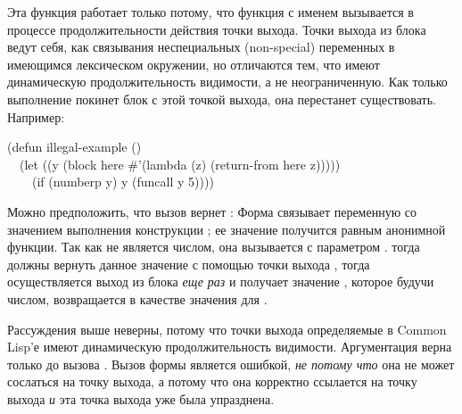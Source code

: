Эта функция  работает только потому, что функция с именем
 вызывается в процессе продолжительности действия точки выхода.
Точки выхода из блока ведут себя, как связывания неспециальных (non-special)
переменных в имеющимся лексическом окружении, но отличаются тем, что имеют
динамическую продолжительность видимости, а не неограниченную. Как только
выполнение покинет блок с этой точкой выхода, она перестанет
существовать. Например: 

\begin{lisp}
(defun illegal-example () \\
~~(let ((y (block here \#'(lambda (z) (return-from here z))))) \\
~~~~(if (numberp y) y (funcall y 5))))
\end{lisp}

Можно предположить, что вызов  вернет :
Форма  связывает переменную  со значением выполнения конструкции
; ее значение получится равным анонимной функции. Так как  не
является числом, она вызывается с параметром .  тогда
должны вернуть данное значение с помощью точки выхода , тогда
осуществляется выход из блока \emph{еще раз} и  получает значение ,
которое будучи числом, возвращается в качестве значения для .

Рассуждения выше неверны, потому что точки выхода определяемые в
Common Lisp'е имеют динамическую продолжительность видимости. Аргументация верна
только до вызова . Вызов формы  является
ошибкой, \emph{не потому что} она не может сослаться на точку выхода, а потому
что она корректно ссылается на точку выхода \emph{и} эта точка выхода уже была
упразднена.

\fi